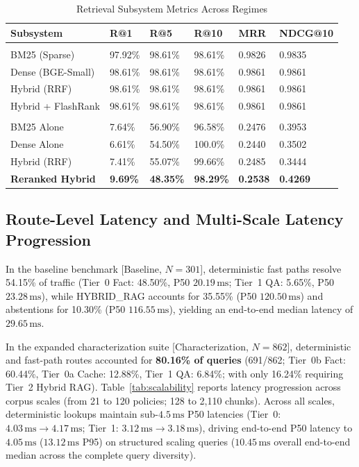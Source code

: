 \documentclass[journal]{IEEEtran}
\newcommand{\ms}{\,\mathrm{ms}}
\begin{document}
\begin{table}[!t]
\caption{Retrieval Subsystem Metrics Across Regimes}
\label{tab:retrieval}
\centering
\scriptsize
\setlength{\tabcolsep}{1.8pt}
\renewcommand{\arraystretch}{0.85}
\begin{tabularx}{\columnwidth}{>{\raggedright\arraybackslash}p{2.3cm}YYYYY}
\toprule
\textbf{Subsystem} & \textbf{R@1} & \textbf{R@5} & \textbf{R@10} & \textbf{MRR} & \textbf{NDCG@10}\\
\midrule
{}\\
BM25 (Sparse) & 97.92\% & 98.61\% & 98.61\% & 0.9826 & 0.9835\\
Dense (BGE-Small) & 98.61\% & 98.61\% & 98.61\% & 0.9861 & 0.9861\\
Hybrid (RRF) & 98.61\% & 98.61\% & 98.61\% & 0.9861 & 0.9861\\
Hybrid + FlashRank & 98.61\% & 98.61\% & 98.61\% & 0.9861 & 0.9861\\
\midrule
{}\\
BM25 Alone & 7.64\% & 56.90\% & 96.58\% & 0.2476 & 0.3953\\
Dense Alone & 6.61\% & 54.50\% & 100.0\% & 0.2440 & 0.3502\\
Hybrid (RRF) & 7.41\% & 55.07\% & 99.66\% & 0.2485 & 0.3444\\
\textbf{Reranked Hybrid} & \textbf{9.69\%} & \textbf{48.35\%} & \textbf{98.29\%} & \textbf{0.2538} & \textbf{0.4269}\\
\bottomrule
\end{tabularx}
\end{table}

\subsection{Route-Level Latency and Multi-Scale Latency Progression}
In the baseline benchmark [Baseline, $N=301$], deterministic fast paths resolve 54.15\% of traffic (Tier~0 Fact: 48.50\%, P50 $20.19\ms$; Tier~1 QA: 5.65\%, P50 $23.28\ms$), while HYBRID\_RAG accounts for 35.55\% (P50 $120.50\ms$) and abstentions for 10.30\% (P50 $116.55\ms$), yielding an end-to-end median latency of $29.65\ms$.

In the expanded characterization suite [Characterization, $N=862$], deterministic and fast-path routes accounted for \textbf{80.16\% of queries} (691/862; Tier~0b Fact: 60.44\%, Tier~0a Cache: 12.88\%, Tier~1 QA: 6.84\%; with only 16.24\% requiring Tier~2 Hybrid RAG). Table~\ref{tab:scalability} reports latency progression across corpus scales (from 21 to 120 policies; 128 to 2,110 chunks). Across all scales, deterministic lookups maintain sub-$4.5\ms$ P50 latencies (Tier~0: $4.03\ms \to 4.17\ms$; Tier~1: $3.12\ms \to 3.18\ms$), driving end-to-end P50 latency to $4.05\ms$ ($13.12\ms$ P95) on structured scaling queries ($10.45\ms$ overall end-to-end median across the complete query diversity).
\end{document}
